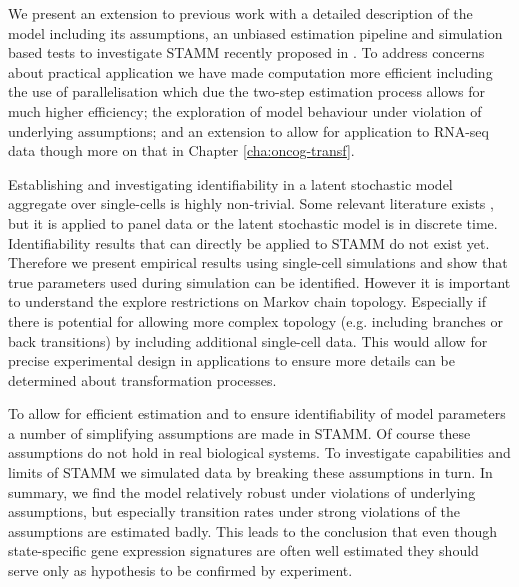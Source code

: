 We present an extension to previous work with a detailed description of the model including its assumptions, an unbiased estimation pipeline and simulation based tests to investigate STAMM recently proposed in \cite{Armond:2013}. To address concerns about practical application we have made computation more efficient including the use of parallelisation which due the two-step estimation process allows for much higher efficiency; the exploration of model behaviour under violation of underlying assumptions; and an extension to allow for application to RNA-seq data though more on that in Chapter \ref{cha:oncog-transf}.



Establishing and investigating identifiability in a latent stochastic model aggregate over single-cells is highly non-trivial. Some relevant literature exists \citep{Kalbfleisch:1983vd, Kalbfleisch:1984wz, Kalbfleisch:1985tw}, but it is applied to panel data or the latent stochastic model is in discrete time. Identifiability results that can directly be applied to STAMM do not exist yet.  Therefore we present empirical results using single-cell simulations and show that true parameters used during simulation can be identified. However it is important to understand the explore restrictions on Markov chain topology. Especially if there is potential for allowing more complex topology (e.g. including branches or back transitions) by including additional single-cell data. This would allow for precise experimental design in applications to ensure more details can be determined about transformation processes.
  
To allow for efficient estimation and to ensure identifiability of model parameters a number of simplifying assumptions are made in STAMM. Of course these assumptions do not hold in real biological systems. To investigate capabilities and limits of STAMM we simulated data by breaking these assumptions in turn. In summary, we find the model relatively robust under violations of underlying assumptions, but especially transition rates under strong violations of the assumptions are estimated badly. This leads to the conclusion that even though state-specific gene expression signatures are often well estimated they should serve only as hypothesis to be confirmed by experiment.


